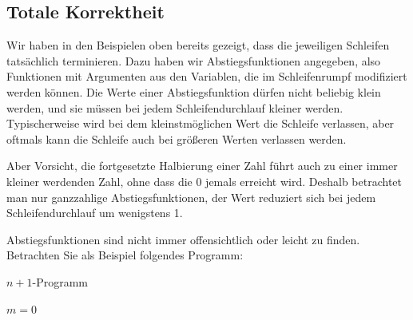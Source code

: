 \subsection{Totale Korrektheit}
\label{sec:Kap-11-2-5}


Wir haben in den Beispielen oben bereits gezeigt, dass die jeweiligen Schleifen tatsächlich terminieren. Dazu haben wir Abstiegsfunktionen angegeben, also Funktionen mit Argumenten aus den Variablen, die im Schleifenrumpf modifiziert werden können. Die Werte einer Abstiegsfunktion dürfen nicht beliebig klein werden, und sie müssen bei jedem Schleifendurchlauf kleiner werden. Typischerweise wird bei dem kleinstmöglichen Wert die Schleife verlassen, aber oftmals kann die Schleife auch bei größeren Werten verlassen werden.

Aber Vorsicht, die fortgesetzte Halbierung einer Zahl führt auch zu einer immer kleiner werdenden Zahl, ohne dass die 0 jemals erreicht wird. Deshalb betrachtet man nur ganzzahlige Abstiegsfunktionen, \dasHeisst der Wert reduziert sich bei jedem Schleifendurchlauf um wenigstens 1.

Abstiegsfunktionen sind nicht immer offensichtlich oder leicht zu finden. Betrachten Sie als Beispiel folgendes Programm:

\vspace{\baselineskip} %

\begin{algorithm}[H]
	\caption{$n+1$-Programm}
	\label{algo:n_plus_1_programm}
	
	\vspace{2mm} %
	\vspace{\baselineskip}
	
	
	\vspace{2mm} %
	\vspace{\baselineskip}
	
	$m = 0$\;
	
	\vspace{2mm} %
	\vspace{\baselineskip}

	\;
	
	\vspace{2mm} %
	\vspace{\baselineskip}
	
	\vspace{2mm} %
	\vspace{\baselineskip}
\end{algorithm}

